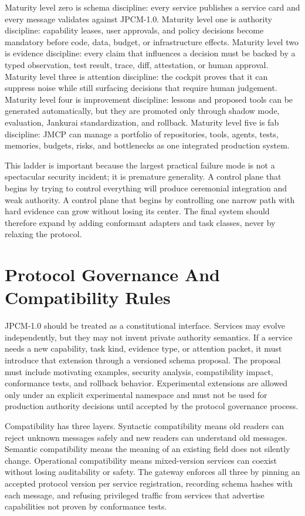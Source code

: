 \documentclass[10pt,journal,onecolumn]{IEEEtran}
\begin{document}
Maturity level zero is schema discipline: every service publishes a service card and every message validates against JPCM-1.0.  Maturity level one is authority discipline: capability leases, user approvals, and policy decisions become mandatory before code, data, budget, or infrastructure effects.  Maturity level two is evidence discipline: every claim that influences a decision must be backed by a typed observation, test result, trace, diff, attestation, or human approval.  Maturity level three is attention discipline: the cockpit proves that it can suppress noise while still surfacing decisions that require human judgement.  Maturity level four is improvement discipline: lessons and proposed tools can be generated automatically, but they are promoted only through shadow mode, evaluation, Jankurai standardization, and rollback.  Maturity level five is fab discipline: JMCP can manage a portfolio of repositories, tools, agents, tests, memories, budgets, risks, and bottlenecks as one integrated production system.

This ladder is important because the largest practical failure mode is not a spectacular security incident; it is premature generality.  A control plane that begins by trying to control everything will produce ceremonial integration and weak authority.  A control plane that begins by controlling one narrow path with hard evidence can grow without losing its center.  The final system should therefore expand by adding conformant adapters and task classes, never by relaxing the protocol.

\section{Protocol Governance And Compatibility Rules}
JPCM-1.0 should be treated as a constitutional interface.  Services may evolve independently, but they may not invent private authority semantics.  If a service needs a new capability, task kind, evidence type, or attention packet, it must introduce that extension through a versioned schema proposal.  The proposal must include motivating examples, security analysis, compatibility impact, conformance tests, and rollback behavior.  Experimental extensions are allowed only under an explicit experimental namespace and must not be used for production authority decisions until accepted by the protocol governance process.

Compatibility has three layers.  Syntactic compatibility means old readers can reject unknown messages safely and new readers can understand old messages.  Semantic compatibility means the meaning of an existing field does not silently change.  Operational compatibility means mixed-version services can coexist without losing auditability or safety.  The gateway enforces all three by pinning an accepted protocol version per service registration, recording schema hashes with each message, and refusing privileged traffic from services that advertise capabilities not proven by conformance tests.
\end{document}
